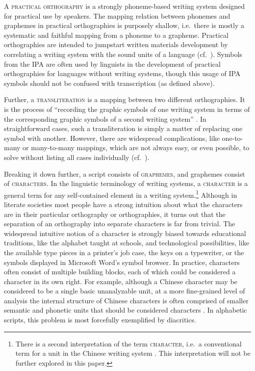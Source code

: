 A \textsc{practical orthography} is a strongly phoneme-based writing system designed for practical use by speakers. The mapping relation between phonemes and graphemes in practical orthographies is purposely shallow, i.e.~there is mostly a systematic and faithful mapping from a phoneme to a grapheme. Practical orthographies are intended to jumpstart written materials development by correlating a writing system with the sound units of a language (cf.~\citet{MeinhofJones1928}). Symbols from the IPA are often used by linguists in the development of practical orthographies for languages without writing systems, though this usage of IPA symbols should not be confused with transcription (as defined above). 

Further, a \textsc{transliteration} is a mapping between two different orthographies. It is the process of ``recording the graphic symbols of one writing system in terms of the corresponding graphic symbols of a second writing system'' \citep[396]{Kemp2006}. In straightforward cases, such a transliteration is simply a matter of replacing one symbol with another. However, there are widespread complications, like one-to-many or many-to-many mappings, which are not always easy, or even possible, to solve without listing all cases individually (cf.~\citet[chp 2]{Moran2012}).

Breaking it down further, a script consists of \textsc{graphemes}, and graphemes consist of \textsc{characters}. In the linguistic terminology of writing systems, a \textsc{character} is a general term for any self-contained element in a writing system.\footnote{There is a second interpretation of the term \textsc{character}, i.e.~a conventional term for a unit in the Chinese writing system \citep{Daniels1996}. This interpretation will not be further explored in this paper.} Although in literate societies most people have a strong intuition about what the characters are in their particular orthography or orthographies, it turns out that the separation of an orthography into separate characters is far from trivial. The widespread intuitive notion of a character is strongly biased towards educational traditions, like the alphabet taught at schools, and technological possibilities, like the available type pieces in a printer's job case, the keys on a typewriter, or the symbols displayed in Microsoft Word's symbol browser. In practice, characters often consist of multiple building blocks, each of which could be considered a character in its own right. For example, although a Chinese character may be considered to be a single basic unanalyzable unit, at a more fine-grained level of analysis the internal structure of Chinese characters is often comprised of smaller semantic and phonetic units that should be considered characters \citep{Sproat2000}. In alphabetic scripts, this problem is most forcefully exemplified by diacritics. 

